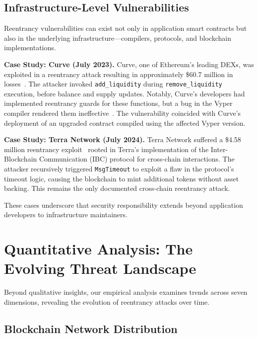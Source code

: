 \subsection{Infrastructure-Level Vulnerabilities}
\label{sec:results-infrastructure}
\label{case-study:8}
\label{case-study:9}

Reentrancy vulnerabilities can exist not only in application smart contracts but also in the underlying infrastructure---compilers, protocols, and blockchain implementations.

\textbf{Case Study: Curve (July 2023).} Curve, one of Ethereum's leading DEXs, was exploited in a reentrancy attack resulting in approximately \$60.7 million in losses~\cite{attack-report:curve}. The attacker invoked \lstinline{add_liquidity} during \lstinline{remove_liquidity} execution, before balance and supply updates. Notably, Curve's developers had implemented reentrancy guards for these functions, but a bug in the Vyper compiler rendered them ineffective~\cite{vul-report:vyper}. The vulnerability coincided with Curve's deployment of an upgraded contract compiled using the affected Vyper version.

\textbf{Case Study: Terra Network (July 2024).} Terra Network suffered a \$4.58 million reentrancy exploit~\cite{attack-report:terra} rooted in Terra's implementation of the Inter-Blockchain Communication (IBC) protocol for cross-chain interactions. The attacker recursively triggered \lstinline{MsgTimeout} to exploit a flaw in the protocol's timeout logic, causing the blockchain to mint additional tokens without asset backing. This remains the only documented cross-chain reentrancy attack.

These cases underscore that security responsibility extends beyond application developers to infrastructure maintainers.

\section{Quantitative Analysis: The Evolving Threat Landscape}
\label{sec:results-quantitative}

Beyond qualitative insights, our empirical analysis examines trends across seven dimensions, revealing the evolution of reentrancy attacks over time.

\subsection{Blockchain Network Distribution}
\label{sec:results-network}

